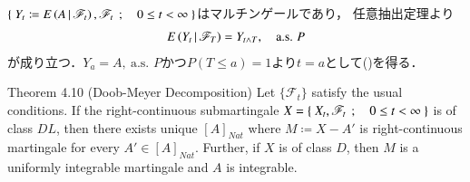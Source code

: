 	\begin{prf}
		$\left\{\ Y_t \coloneqq E\left( A \, \middle|\, \mathscr{F}_t \right),\mathscr{F}_t\ \, ; \quad 0 \leq t < \infty\ \right\}$はマルチンゲールであり，
		任意抽出定理より
		\begin{align}
			E\left( Y_t \, \middle|\, \mathscr{F}_T \right) = Y_{t \wedge T},
			\quad \mbox{a.s. $P$}
		\end{align}
		が成り立つ．$Y_a = A,\ \mbox{a.s. $P$}$かつ$P(T \leq a)=1$より$t=a$として()を得る．
		\QED
	\end{prf}
	
	\begin{itembox}[l]{Theorem 4.10 (Doob-Meyer Decomposition)}
		Let $\{\mathscr{F}_t\}$ satisfy the usual conditions. If the right-continuous
		submartingale $X = \left\{\ X_t,\mathscr{F}_t\ \, ; \quad 0 \leq t < \infty\ \right\}$ is of class $DL$, then
		there exists unique $[A]_{Nat}$ where $M \coloneqq X - A'$ is right-continuous martingale
		for every $A' \in [A]_{Nat}$.
		Further, if $X$ is of class $D$, then $M$ is a uniformly integrable martingale 
		and $A$ is integrable.	
	\end{itembox}
	
